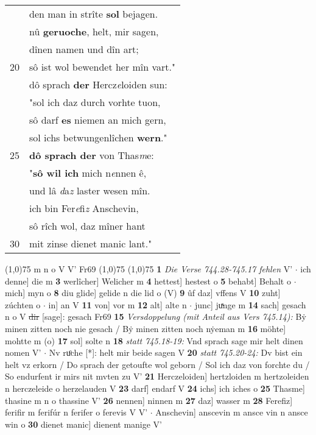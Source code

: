 \documentclass[8pt,a4paper,notitlepage]{article}
\begin{document}
\begin{table}[ht]
\begin{minipage}[t]{0.5\linewidth}
\begin{tabular}{rl}
 & den man in strîte \textbf{sol} bejagen.\\ 
 & nû \textbf{geruoche}, helt, mir sagen,\\ 
 & dînen namen und dîn art;\\ 
20 & sô ist wol bewendet her mîn vart."\\ 
 & dô sprach \textbf{der} Hercz\textit{e}loiden sun:\\ 
 & "sol ich daz durch vorhte tuon,\\ 
 & sô darf \textbf{es} niemen an mich gern,\\ 
 & sol ichs betwungenlîchen \textbf{wern}."\\ 
25 & \textbf{dô sprach der} von Thas\textit{m}e:\\ 
 & "\textbf{sô wil ich} mich n\textit{e}nnen ê,\\ 
 & und lâ \textit{d}a\textit{z} laster wesen mîn.\\ 
 & ich bin Fer\textit{e}fi\textit{z} Anschevin,\\ 
 & sô rîch wol, daz mîner hant\\ 
30 & mit zinse dienet manic lant."\\ 
\end{tabular}
\scriptsize
\line(1,0){75} \newline
m n o V V' Fr69 \newline
\line(1,0){75} \newline
\newline
\line(1,0){75} \newline
\textbf{1} \textit{Die Verse 744.28-745.17 fehlen} V'   $\cdot$ ich denne] die m \textbf{3} werlîcher] Welicher m \textbf{4} hettest] hestest o \textbf{5} behabt] Behalt o  $\cdot$ mich] myn o \textbf{8} diu glide] gelide n die lid o (V) \textbf{9} ûf daz] vffens V \textbf{10} zuht] zúchten o  $\cdot$ in] an V \textbf{11} von] vor m \textbf{12} alt] alte n  $\cdot$ junc] juͯnge m \textbf{14} sach] gesach n o V \sout{dir} [sage]: gesach Fr69 \textbf{15} \textit{Versdoppelung (mit Anteil aus Vers 745.14):} Bẏ minen zitten noch nie gesach / Bẏ minen zitten noch nẏeman m  \textbf{16} möhte] mohtte m (o) \textbf{17} sol] solte n \textbf{18} \textit{statt 745.18-19:} Vnd sprach sage mir helt dinen nomen V'   $\cdot$ Nv ruͦche [*]: helt mir beide sagen V \textbf{20} \textit{statt 745.20-24:} Dv bist ein helt vz erkorn / Do sprach der getoufte wol geborn / Sol ich daz von forchte du / So endurfent ir mirs nit mvten zu V'  \textbf{21} Herczeloiden] hertzloiden m hertzoleiden n herczeleide o herzelauden V \textbf{23} darf] endarf V \textbf{24} ichs] ich iches o \textbf{25} Thasme] thasine m n o thassine V' \textbf{26} nennen] ninnen m \textbf{27} daz] wasser m \textbf{28} Ferefiz] ferifir m ferifúr n ferifer o ferevis V V'  $\cdot$ Anschevin] anscevin m ansce vin n ansce win o \textbf{30} dienet manic] dienent manige V' \newline
\end{minipage}
\end{table}
\end{document}
